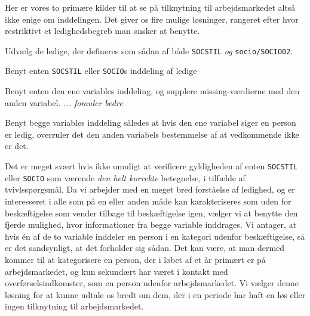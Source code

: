 Her er vores to primære kilder til at se på tilknytning til arbejdsmarkedet altså ikke enige om inddelingen. Det giver os fire mulige løsninger, rangeret efter hvor restriktivt et ledighedsbegreb man ønsker at benytte.
%
\begin{description} [topsep=6pt,itemsep=-1ex]
  \item[Restriktiv] Udvælg de ledige, der defineres som sådan af både \texttt{SOCSTIL} \emph{og} \texttt{socio/SOCIO02}.
  \item[Semirestriktiv] Benyt enten \texttt{SOCSTIL} eller \texttt{SOCIO}s inddeling af ledige
  \item[Semibred] Benyt enten den ene variables inddeling, og supplere missing-værdierne med den anden variabel. \emph{... fomuler bedre}
 \item[Bred] Benyt begge variables inddeling således at hvis den ene variabel siger en person er ledig, overruler det den anden variabels bestemmelse af at vedkommende ikke er det.
\end{description}
%
Det er meget svært hvis ikke umuligt at verificere gyldigheden af enten \texttt{SOCSTIL} eller \texttt{SOCIO} som værende \emph{den helt korrekte} betegnelse, i tilfælde af tvivlsspørgsmål. Da vi arbejder med en meget bred forståelse af ledighed, og er interesseret i alle som på en eller anden måde kan karakteriseres som uden for beskæftigelse som vender tilbage til beskæftigelse igen, vælger vi at benytte den fjerde mulighed, hvor informationer fra begge variable inddrages. Vi antager, at hvis én af de to variable inddeler en person i en kategori udenfor beskæftigelse, så er det sandsynligt, at det forholder sig sådan. Det kan være, at man dermed kommer til at kategorisere en person, der i løbet af et år primært er på arbejdsmarkedet, og kun sekundært har været i kontakt med overførselsindkomster, som en person udenfor arbejdsmarkedet. Vi vælger denne løsning for at kunne udtale os bredt om dem, der i en periode har haft en løs eller ingen tilknytning til arbejdsmarkedet. 



